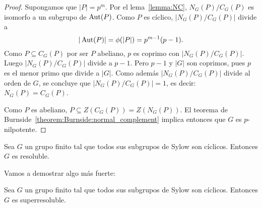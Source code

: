 \begin{proof}
	Supongamos que $|P|=p^m$.  Por el lema~\ref{lemma:NC}, $N_G(P)/C_G(P)$ es
	isomorfo a un subgrupo de $\operatorname{Aut}(P)$. Como $P$ es cíclico, $|N_G(P)/C_G(P)|$ divide a 
	\[
		|\operatorname{Aut}(P)|=\phi(|P|)=p^{m-1}(p-1).
	\]
	Como $P\subseteq C_G(P)$ por ser $P$ abeliano, $p$ es coprimo con
	$|N_G(P)/C_G(P)|$.  Luego $|N_G(P)/C_G(P)|$ divide a $p-1$. Pero $p-1$ y
	$|G|$ son coprimos, pues $p$ es el menor primo que divide a $|G|$.  Como
	además $|N_G(P)/C_G(P)|$ divide al orden de $G$, se concluye que
	$|N_G(P)/C_G(P)|=1$, es decir: $N_G(P)=C_G(P)$. 

	Como $P$ es abeliano, $P\subseteq Z(C_G(P))=Z(N_G(P))$. El teorema de
	Burnside~\ref{theorem:Burnside:normal_complement} implica entonces que $G$
	es $p$-nilpotente. 
\end{proof}

\begin{exercise}
	Sea $G$ un grupo finito tal que todos sus subgrupos de Sylow son cíclicos.
	Entonces $G$ es resoluble.
\end{exercise}

Vamos a demostrar algo más fuerte:

\begin{corollary}
	\label{corollary:Sylow_ciclicos:resoluble}
	Sea $G$ un grupo finito tal que todos sus subgrupos de Sylow son cíclicos.
	Entonces $G$ es superresoluble.
\end{corollary}


